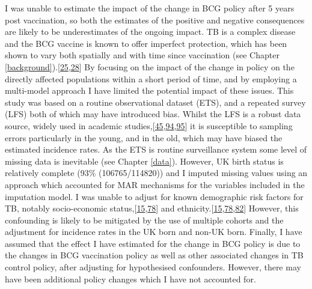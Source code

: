 \documentclass[11pt,twoside]{bristolthesis}
\begin{document}
  I was unable to estimate the impact of the change in BCG policy after 5 years post vaccination, so both the estimates of the positive and negative consequences are likely to be underestimates of the ongoing impact. TB is a complex disease and the BCG vaccine is known to offer imperfect protection, which has been shown to vary both spatially and with time since vaccination (see Chapter \ref{background}).{[}\protect\hyperlink{ref-Mangtani2014a}{25},\protect\hyperlink{ref-Abubakar2013}{28}{]} By focusing on the impact of the change in policy on the directly affected populations within a short period of time, and by employing a multi-model approach I have limited the potential impact of these issues. This study was based on a routine observational dataset (ETS), and a repeated survey (LFS) both of which may have introduced bias. Whilst the LFS is a robust data source, widely used in academic studies,{[}\protect\hyperlink{ref-French2007}{45},\protect\hyperlink{ref-Davies2016a}{94},\protect\hyperlink{ref-Lindley2009}{95}{]} it is susceptible to sampling errors particularly in the young, and in the old, which may have biased the estimated incidence rates. As the ETS is routine surveillance system some level of missing data is inevitable (see Chapter \ref{data}). However, UK birth status is relatively complete (93\% (106765/114820)) and I imputed missing values using an approach which accounted for MAR mechanisms for the variables included in the imputation model. I was unable to adjust for known demographic risk factors for TB, notably socio-economic status,{[}\protect\hyperlink{ref-Bhatti1995}{15},\protect\hyperlink{ref-Parslow2001}{78}{]} and ethnicity.{[}\protect\hyperlink{ref-Bhatti1995}{15},\protect\hyperlink{ref-Parslow2001}{78},\protect\hyperlink{ref-Abubakar2008}{82}{]} However, this confounding is likely to be mitigated by the use of multiple cohorts and the adjustment for incidence rates in the UK born and non-UK born. Finally, I have assumed that the effect I have estimated for the change in BCG policy is due to the changes in BCG vaccination policy as well as other associated changes in TB control policy, after adjusting for hypothesised confounders. However, there may have been additional policy changes which I have not accounted for.
  
\end{document}
